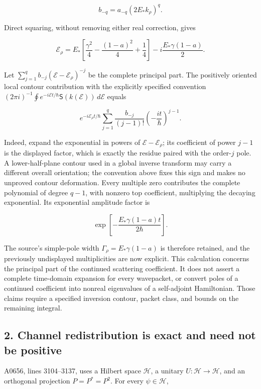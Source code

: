 \documentclass[10pt,a4paper,oneside]{report}
\begin{document}
\[
b_{-q}=a_{-q}(2E_*k_\rho)^q.
\]

Direct squaring, without removing either real correction, gives

\[
\mathcal E_\rho
=E_*\left[\frac{\gamma^2}{4}-\frac{(1-a)^2}{4}+\frac14\right]
-i\frac{E_*\gamma(1-a)}2.
\]

Let \(\sum_{j=1}^{q}b_{-j}(\mathcal E-\mathcal E_\rho)^{-j}\) be the
complete principal part. The positively oriented local contour
contribution with the explicitly specified convention
\((2\pi i)^{-1}\oint e^{-i\mathcal Et/\hbar}\mathsf S(k(\mathcal E))\,d\mathcal E\)
equals

\[
e^{-i\mathcal E_\rho t/\hbar}
\sum_{j=1}^{q}\frac{b_{-j}}{(j-1)!}
\left(-\frac{it}{\hbar}\right)^{j-1}.
\]

Indeed, expand the exponential in powers of
\(\mathcal E-\mathcal E_\rho\); its coefficient of power \(j-1\) is the
displayed factor, which is exactly the residue paired with the
order-\(j\) pole. A lower-half-plane contour used in a global inverse
transform may carry a different overall orientation; the convention
above fixes this sign and makes no unproved contour deformation. Every
multiple zero contributes the complete polynomial of degree \(q-1\),
with nonzero top coefficient, multiplying the decaying exponential. Its
exponential amplitude factor is

\[
\exp\!\left[-\frac{E_*\gamma(1-a)t}{2\hbar}\right].
\]

The source's simple-pole width \(\Gamma_\rho=E_*\gamma(1-a)\) is
therefore retained, and the previously undisplayed multiplicities are
now explicit. This calculation concerns the principal part of the
continued scattering coefficient. It does not assert a complete
time-domain expansion for every wavepacket, or convert poles of a
continued coefficient into nonreal eigenvalues of a self-adjoint
Hamiltonian. Those claims require a specified inversion contour, packet
class, and bounds on the remaining integral.

\subsection{2. Channel redistribution is exact and need not be
positive}\label{proof10:channel-redistribution-is-exact-and-need-not-be-positive}

A0656, lines 3104--3137, uses a Hilbert space \(\mathcal H\), a unitary
\(U:\mathcal H\to\mathcal H\), and an orthogonal projection
\(P=P^*=P^2\). For every \(\psi\in\mathcal H\),
\end{document}
